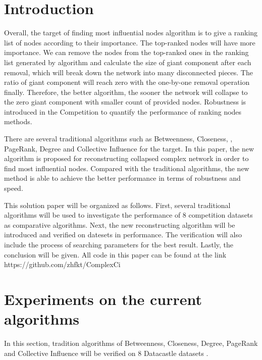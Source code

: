 \documentclass{article}
\begin{document}
	\section{Introduction}


	Overall, the target of finding most influential nodes algorithm is to give a ranking list of nodes according to their importance. The top-ranked nodes will have more importance. We can remove the nodes from the top-ranked ones in the ranking list generated by algorithm and calculate the size of giant component after each removal, which will break down the network into many disconnected pieces. The ratio of giant component will reach zero with the one-by-one removal operation finally. Therefore, the better algorithm, the sooner the network will collapse to the zero giant component with smaller count of provided nodes. Robustness \cite{schneider2011mitigation} is introduced in the Competition to quantify the performance of ranking nodes methods. 
	
	There are several traditional algorithms such as  Betweenness\cite{wikiBetweennesscentrality}, Closeness\cite{wikiClosenesscentrality}, \cite{wikiCentrality}, PageRank\cite{wikiPageRank}, Degree\cite{wikiCentrality} and Collective Influence\cite{morone2015influence}\cite{morone2016collective} for the target. In this paper, the new algorithm is proposed for reconstructing collapsed complex network in order to find most influential nodes. Compared with the traditional algorithms, the new method is able to achieve the better performance in terms of robustness and speed. 
	
	This solution paper will be organized as follows. First, several traditional algorithms will be used to investigate the performance of 8 competition datasets as comparative algorithms. Next, the new reconstructing algorithm will be introduced and verified on datesets in performance. The verification will also include the process of searching parameters for the best result. Lastly, the conclusion will be given. All code in this paper can be found at the link https://github.com/zhfkt/ComplexCi \cite{zhfktgithub} \cite{zhfkt2017887989}

	\section{Experiments on the current algorithms}
	
	In this section, tradition algorithms of Betweenness\cite{wikiBetweennesscentrality}, Closeness\cite{wikiClosenesscentrality}, Degree\cite{wikiCentrality}, PageRank\cite{wikiPageRank} and Collective Influence\cite{morone2015influence}\cite{morone2016collective} will be verified on 8 Datacastle datasets .
\end{document}
